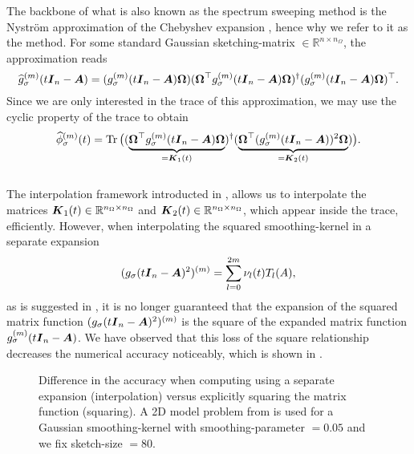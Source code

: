 The backbone of what is also known as the spectrum sweeping method \cite{lin2017randomized}
is the Nystr\"om approximation of the Chebyshev expansion ,
hence why we refer to it as the  method. 
For some standard Gaussian \gls{sketching-matrix} $\in \mathbb{R}^{n \times n_{\Omega}}$,
the approximation reads
\begin{equation}
    \widehat{g}_{\sigma}^{(m)}(t\boldsymbol{I}_n - \boldsymbol{A})
    = (g_{\sigma}^{(m)}(t\boldsymbol{I}_n - \boldsymbol{A}) \boldsymbol{\Omega}) (\boldsymbol{\Omega}^{\top} g_{\sigma}^{(m)}(t\boldsymbol{I}_n - \boldsymbol{A}) \boldsymbol{\Omega})^{\dagger} (g_{\sigma}^{(m)}(t\boldsymbol{I}_n - \boldsymbol{A}) \boldsymbol{\Omega})^{\top}.
    \label{equ:3-nystrom-nystrom-smoothing-kernel}
\end{equation}
Since we are only interested in the trace of this approximation,
we may use the cyclic property of the trace to obtain
\begin{equation}
    \widehat{\phi}_{\sigma}^{(m)}(t)
        = \operatorname{Tr}\big((\underbrace{\boldsymbol{\Omega}^{\top} g_{\sigma}^{(m)}(t\boldsymbol{I}_n - \boldsymbol{A}) \boldsymbol{\Omega}}_{=\boldsymbol{K}_1(t)})^{\dagger} (\underbrace{\boldsymbol{\Omega}^{\top} (g_{\sigma}^{(m)}(t\boldsymbol{I}_n - \boldsymbol{A}))^2 \boldsymbol{\Omega}}_{=\boldsymbol{K}_2(t)})\big).
    \label{equ:3-nystrom-spectral-density}
\end{equation}\\

The interpolation framework introducted in ,
allows us to interpolate the matrices $\boldsymbol{K}_1(t) \in \mathbb{R}^{n_{\Omega} \times n_{\Omega}}$
and $\boldsymbol{K}_2(t) \in \mathbb{R}^{n_{\Omega} \times n_{\Omega}}$,
which appear inside the trace, efficiently.
However, when interpolating the
squared \gls{smoothing-kernel} in a separate expansion
\begin{equation}
    (g_{\sigma}(t\boldsymbol{I}_n - \boldsymbol{A})^2)^{(m)} = \sum_{l=0}^{2m} \nu_l(t) T_l(A),
    \label{equ:3-nystrom-ESS-chebyshev-expansion}
\end{equation}
as is suggested in \cite{lin2017randomized}, it is no longer guaranteed that
the expansion of the squared matrix function $(g_{\sigma}(t\boldsymbol{I}_n - \boldsymbol{A})^2)^{(m)}$
is the square of the expanded matrix function $g_{\sigma}^{(m)}(t\boldsymbol{I}_n - \boldsymbol{A})$.
We have observed that this loss of the square relationship
decreases the numerical accuracy noticeably, which is
shown in .\\
\begin{figure}[ht]
    \centering
    
    \caption{Difference in the accuracy when computing 
        using a separate expansion (interpolation) versus explicitly squaring
        the matrix function (squaring). A 2D model problem from 
        is used for a Gaussian \gls{smoothing-kernel} with \gls{smoothing-parameter} $=0.05$
        and we fix \gls{sketch-size} $=80$.}
    \label{fig:3-nystrom-interpolation-issue}
\end{figure}

